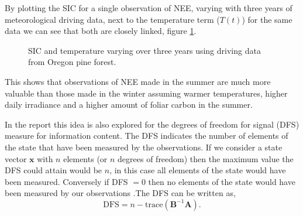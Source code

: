 \documentclass[11pt]{article}
\begin{document}
By plotting the SIC for a single observation of NEE, varying with three years of meteorological driving data, next to the temperature term ($T(t)$) for the same data we can see that both are closely linked, figure \ref{fig:SICNEET}.
\begin{figure}[ht]
\centering
{}
\caption{SIC and temperature varying over three years using driving data from Oregon pine forest.}
\label{fig:SICNEET}
\end{figure}
This shows that observations of NEE made in the summer are much more valuable than those made in the winter assuming warmer temperatures, higher daily irradiance and a higher amount of foliar carbon in the summer.

In the report this idea is also explored for the degrees of freedom for signal (DFS) measure for information content. The DFS indicates the number of elements of the state that have been measured by the observations. If we consider a state vector $\textbf{x}$ with $n$ elements (or $n$ degrees of freedom) then the maximum value the DFS could attain would be $n$, in this case all elements of the state would have been measured. Conversely if DFS $= 0$ then no elements of the state would have been measured by our observations \cite{fowler2011measures}.The DFS can be written as,
\begin{equation}
\text{DFS} = n - \text{trace}(\mathbf{B}^{-1}\mathbf{A}).
\end{equation}
\end{document}
